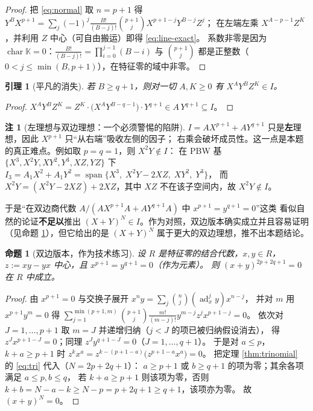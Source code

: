 \documentclass[11pt,UTF8]{ctexart}
\newtheorem{lemma}[theorem]{引理}
\newtheorem{proposition}[theorem]{命题}
\theoremstyle{definition}
\newtheorem{remark}[theorem]{注}
\newcommand{\ad}{\operatorname{ad}}
\newcommand{\chr}{\operatorname{char}}
\newcommand{\K}{\mathbb{K}}
\begin{document}
\begin{proof}
把 \eqref{eq:normal} 取 $n=p+1$ 得
$Y^{B}X^{p+1}=\sum_{j}(-1)^{j}\frac{B!}{(B-j)!}\binom{p+1}{j}X^{p+1-j}Y^{B-j}Z^{j}$；
在左端左乘 $X^{A-p-1}Z^{K}$，并利用 $Z$ 中心（可自由搬运）即得 \eqref{eq:line-exact}。
系数非零是因为 $\chr\K=0$：$\frac{B!}{(B-j)!}=\prod_{i=0}^{j-1}(B-i)$ 与 $\binom{p+1}{j}$
都是正整数（$0<j\le\min(B,p+1)$），在特征零的域中非零。
\end{proof}

\begin{lemma}[平凡的消失]\label{lem:triv}
若 $B\ge q+1$，则对一切 $A,K\ge0$ 有 $X^{A}Y^{B}Z^{K}\in I$。
\end{lemma}

\begin{proof}
$X^{A}Y^{B}Z^{K}=Z^{K}\cdot\bigl(X^{A}Y^{B-q-1}\bigr)\cdot Y^{q+1}\in A\,Y^{q+1}\subseteq I$。
\end{proof}

\begin{remark}[左理想与双边理想：一个必须警惕的陷阱]\label{rem:two-sided}
$I=AX^{p+1}+AY^{q+1}$ 只是\textbf{左}理想，因此 $X^{p+1}$ 只“从右端”吸收左侧的因子；
右乘会破坏成员性。这一点是本题的真正难点。例如取 $p=q=1$，则 $X^{2}Y\notin I$：
在 PBW 基 $\{X^3,X^2Y,XY^2,Y^3,XZ,YZ\}$ 下
$I_3=A_1X^2+A_1Y^2=\operatorname{span}\{X^3,\;X^2Y-2XZ,\;XY^2,\;Y^3\}$，
而 $X^2Y=(X^2Y-2XZ)+2XZ$，其中 $XZ$ 不在该子空间内，故 $X^2Y\notin I$。

于是“在双边商代数 $A/(AX^{p+1}A+AY^{q+1}A)$ 中 $x^{p+1}=y^{q+1}=0$”这类
看似自然的论证\textbf{不足以}推出 $(X+Y)^N\in I$。作为对照，双边版本确实成立并且容易证明
（见命题 \ref{prop:twosided}），但它给出的是 $(X+Y)^N$ 属于更大的双边理想，推不出本题结论。
\end{remark}

\begin{proposition}[双边版本，作为技术练习]\label{prop:twosided}
设 $R$ 是特征零的结合代数，$x,y\in R$，$z:=xy-yx$ 中心，且 $x^{p+1}=y^{q+1}=0$（作为元素）。
则 $(x+y)^{2p+2q+1}=0$ 在 $R$ 中成立。
\end{proposition}

\begin{proof}
由 $x^{p+1}=0$ 与交换子展开 $x^{n}y=\sum_j\binom{n}{j}(\ad_x^{j}y)x^{n-j}$，
并对 $m$ 用 $x^{p+1}y^{m}=0$ 得
$\sum_{j=1}^{\min(p+1,m)}\binom{p+1}{j}\frac{m!}{(m-j)!}y^{m-j}z^{j}x^{p+1-j}=0$。
依次对 $J=1,\dots,p+1$ 取 $m=J$ 并递增归纳（$j<J$ 的项已被归纳假设消去），
得 $z^{J}x^{p+1-J}=0$；同理 $z^{J}y^{q+1-J}=0$（$J=1,\dots,q+1$）。
于是对 $a\le p$，$k+a\ge p+1$ 时 $z^{k}x^{a}=z^{k-(p+1-a)}\bigl(z^{p+1-a}x^{a}\bigr)=0$。
把定理 \ref{thm:trinomial} 的 \eqref{eq:tri} 代入（$N=2p+2q+1$）：
$a\ge p+1$ 或 $b\ge q+1$ 的项为零；其余各项满足 $a\le p,b\le q$，
若 $k+a\ge p+1$ 则该项为零，否则 $k+b=N-a-k\ge N-p=p+2q+1\ge q+1$，该项亦为零。
故 $(x+y)^{N}=0$。
\end{proof}
\end{document}

